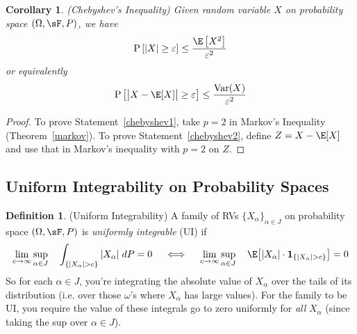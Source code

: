 \documentclass[12pt]{article}
\theoremstyle{plain}
\newtheorem{cor}[thm]{Corollary}
\theoremstyle{definition}
\newtheorem{defn}[thm]{Definition}
\theoremstyle{remark}
\newcommand{\ra}{\rightarrow}
\newcommand{\one}[1]{\mathbf{1}_{#1}}
\newcommand{\Prb}{\operatorname{P}}
\newcommand{\Var}{\operatorname{Var}}
\begin{document}
\begin{cor}{\emph{(Chebyshev's Inequality)}}
Given random variable $X$ on probability space $(\Omega,\sF,P)$, we have
\begin{equation}
  \label{chebyshev1}
  \Prb\left[
    \left\lvert X\right\rvert
    \geq \varepsilon\right]
  \leq \frac{\E\left[X^2\right]}{\varepsilon^2}
\end{equation}
or equivalently
\begin{equation}
  \label{chebyshev2}
  \Prb\left[
    \big\lvert X-\E[X]\big\rvert
    \geq \varepsilon\right]
  \leq \frac{\Var(X)}{\varepsilon^2}
\end{equation}
\end{cor}
\begin{proof}
To prove Statement~\ref{chebyshev1}, take $p=2$ in Markov's Inequality
(Theorem~\ref{markov}).
To prove Statement~\ref{chebyshev2}, define $Z=X-\E[X]$ and use that in
Markov's inequality with $p=2$ on $Z$.
\end{proof}


\clearpage
\subsection{Uniform Integrability on Probability Spaces}

\begin{defn}(Uniform Integrability)
A family of RVs $\{X_\alpha\}_{\alpha \in J}$ on probability space
$(\Omega,\sF,P)$ is \emph{uniformly integrable} (UI) if
\begin{align}
  \lim_{c\ra\infty} \sup_{\alpha\in J}\quad
  \int_{\{|X_\alpha|>c\}}
  |X_\alpha|\; dP = 0
  \quad\iff\quad
  \lim_{c\ra\infty} \sup_{\alpha\in J}\quad
  \E\big[|X_\alpha|\cdot \one{\{|X_\alpha|>c\}} \big]=0
  \label{UIcond}
\end{align}
So for each $\alpha\in J$,
you're integrating the absolute value of $X_\alpha$ over the tails of
its distribution (i.e. over those $\omega$'s where $X_\alpha$ has large
values).
For the family to be UI, you require the value of these integrals
go to zero uniformly for \emph{all} $X_\alpha$ (since taking the sup
over $\alpha \in J$).
\end{defn}
\end{document}
